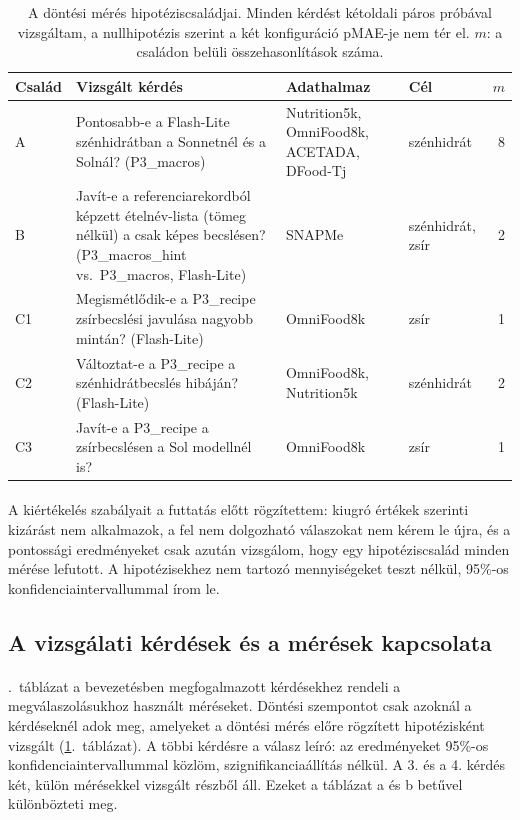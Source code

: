 \begin{table}[h]
\centering
\caption{A döntési mérés hipotéziscsaládjai. Minden kérdést kétoldali páros próbával vizsgáltam, 
a nullhipotézis szerint a két konfiguráció pMAE-je nem tér el. $m$: a családon belüli 
összehasonlítások száma.}\label{tab:hipotezisek}
\begin{tabular}{lp{5.0cm}p{3.6cm}lr}
\hline
Család & Vizsgált kérdés & Adathalmaz & Cél & $m$ \\
\hline
A  & Pontosabb-e a Flash-Lite szénhidrátban a Sonnetnél és a Solnál? (P3\_macros) & Nutrition5k, OmniFood8k, ACETADA, DFood-Tj & szénhidrát & 8 \\
B  & Javít-e a referenciarekordból képzett ételnév-lista (tömeg nélkül) a csak képes becslésen? (P3\_macros\_hint vs.\ P3\_macros, Flash-Lite) & SNAPMe & szénhidrát, zsír & 2 \\
C1 & Megismétlődik-e a P3\_recipe zsírbecslési javulása nagyobb mintán? (Flash-Lite) & OmniFood8k & zsír & 1 \\
C2 & Változtat-e a P3\_recipe a szénhidrátbecslés hibáján? (Flash-Lite) & OmniFood8k, Nutrition5k & szénhidrát & 2 \\
C3 & Javít-e a P3\_recipe a zsírbecslésen a Sol modellnél is? & OmniFood8k & zsír & 1 \\
\hline
\end{tabular}
\end{table}

\paragraph{}A kiértékelés szabályait a futtatás előtt rögzítettem:
kiugró értékek szerinti kizárást nem alkalmazok, a fel nem dolgozható 
válaszokat nem kérem le újra, és a pontossági eredményeket csak azután 
vizsgálom, hogy egy hipotéziscsalád minden mérése lefutott. 
A hipotézisekhez nem tartozó mennyiségeket teszt nélkül, 
95\%-os konfidenciaintervallummal írom le.

\subsection{A vizsgálati kérdések és a mérések kapcsolata}
\label{sec:kerdes_meres}
\paragraph{}\Az{\ref{tab:kerdes_meres}}.~táblázat a bevezetésben megfogalmazott kérdésekhez rendeli 
a megválaszolásukhoz használt méréseket. Döntési szempontot csak azoknál a kérdéseknél adok meg, amelyeket a döntési 
mérés előre rögzített hipotézisként vizsgált (\ref{tab:hipotezisek}.~táblázat). A többi kérdésre a válasz leíró: 
az eredményeket 95\%-os konfidenciaintervallummal közlöm, szignifikanciaállítás nélkül.
A 3. és a 4. kérdés két, külön mérésekkel vizsgált részből áll. Ezeket a táblázat a és b betűvel különbözteti meg.

